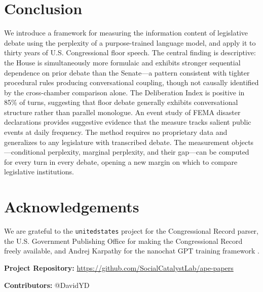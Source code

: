 \documentclass[12pt]{article}
\begin{document}
\section{Conclusion}

We introduce a framework for measuring the information content of legislative debate using the perplexity of a purpose-trained language model, and apply it to thirty years of U.S. Congressional floor speech. The central finding is descriptive: the House is simultaneously more formulaic and exhibits stronger sequential dependence on prior debate than the Senate---a pattern consistent with tighter procedural rules producing conversational coupling, though not causally identified by the cross-chamber comparison alone. The Deliberation Index is positive in 85\% of turns, suggesting that floor debate generally exhibits conversational structure rather than parallel monologue. An event study of FEMA disaster declarations provides suggestive evidence that the measure tracks salient public events at daily frequency. The method requires no proprietary data and generalizes to any legislature with transcribed debate. The measurement objects---conditional perplexity, marginal perplexity, and their gap---can be computed for every turn in every debate, opening a new margin on which to compare legislative institutions.


\section*{Acknowledgements}

We are grateful to the \texttt{unitedstates} project for the Congressional Record parser, the U.S. Government Publishing Office for making the Congressional Record freely available, and Andrej Karpathy for the nanochat GPT training framework \citep{karpathy2025}.

\noindent\textbf{Project Repository:} \url{https://github.com/SocialCatalystLab/ape-papers}

\noindent\textbf{Contributors:} @DavidYD

\label{apep_main_text_end}
\newpage


\newpage
\appendix

\end{document}
